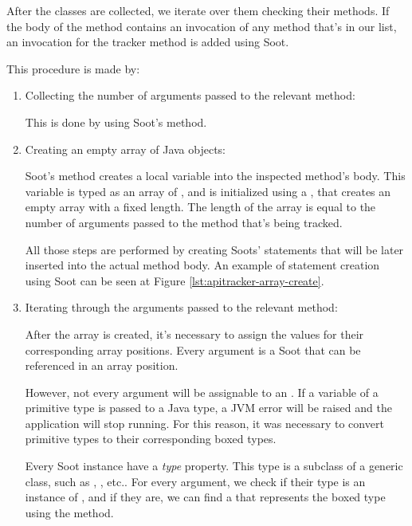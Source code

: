 After the classes are collected, we iterate over them checking their methods. If the body of the method contains an invocation of any method that's in our  list, an invocation for the  tracker method is added using Soot. 

This procedure is made by:

\begin{enumerate}
    \item Collecting the number of arguments passed to the relevant method:
    
    This is done by using Soot's  method.
    \item Creating an empty array of Java objects: 
    
    Soot's  method creates a local variable into the inspected method's body. This variable is typed as an array of , and is initialized using a , that creates an empty array with a fixed length. The length of the array is equal to the number of arguments passed to the method that's being tracked. 

    All those steps are performed by creating Soots' statements that will be later inserted into the actual method body. An example of statement creation using Soot can be seen at Figure \ref{lst:apitracker-array-create}.
   
    \item Iterating through the arguments passed to the relevant method: 

    After the array is created, it's necessary to assign the values for their corresponding array positions. Every argument is a Soot  that can be referenced in an array position.

    However, not every argument will be assignable to an . If a variable of a primitive type is passed to a Java  type, a JVM error will be raised and the application will stop running. For this reason, it was necessary to convert primitive types to their corresponding boxed types.


        Every Soot  instance have a \textit{type} property. This type is a subclass of a generic  class, such as , , etc.. For every argument, we check if their type is an instance of , and if they are, we can find a  that represents the boxed type using the  method.


\end{enumerate}
